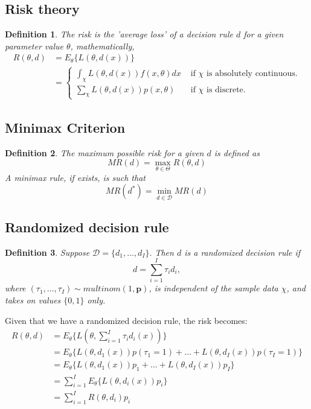 \documentclass[12pt]{report} \addtolength{\textheight}{2in}
\newtheorem{defn}{Definition}
\newcommand{\dec}{\mathscr{D}}
\begin{document}
\subsection*{Risk theory}
\begin{defn} The risk is the 'average loss' of a decision rule $d$ for a given parameter value $\theta$, mathematically,
\begin{align*}
R(\theta, d) &= E_{\theta} \{L(\theta, d(x))\}\\
&= \begin{cases}
\int_{\chi} L(\theta, d(x))f(x,\theta)dx & \text{ if $\chi$ is absolutely continuous.}\\
\sum_{\chi} L(\theta, d(x)) p(x,\theta)  & \text{ if $\chi$ is discrete.}
\end{cases}
\end{align*}
\end{defn}
\subsection*{Minimax Criterion}
\begin{defn}
The maximum possible risk for a given $d$ is defined as 
\begin{displaymath}
MR(d)=\max_{\theta \in \Theta} R(\theta, d)
\end{displaymath}
A minimax rule, if exists, is such that 
\begin{displaymath}
MR(d^*)=\min_{d\in\dec}MR(d)
\end{displaymath}
\end{defn}
\subsection*{Randomized decision rule}
\begin{defn}
Suppose $\dec= \{d_1,\dots, d_I\}.$ Then $d$ is a randomized decision rule if
\begin{displaymath}
d=\sum_{i=1}^{I} \tau_i d_i,
\end{displaymath}
where $(\tau_1,\dots,\tau_I ) \sim multinom(1,\textbf{p})$, is independent of the sample data $\chi$, and takes on values $\{0,1\}$ only.
\end{defn}
Given that we have a randomized decision rule, the risk becomes:
\begin{align*}
R(\theta, d)&= E_{\theta} \{L(\theta, \sum_{i=1}^{I} \tau_i d_i(x))\}\\
&= E_{\theta} \{L(\theta, d_1(x)) p(\tau_1=1) +\dots + L(\theta, d_I(x))p(\tau_I=1)\}\\
&=E_{\theta}\{L(\theta,d_1(x))p_1+\dots+L(\theta,d_I(x))p_I\}\\
&=\sum_{i=1}^{I} E_{\theta}\{L(\theta, d_i(x))p_i\}\\
&=\sum_{i=1}^{I} R(\theta, d_i) p_i
\end{align*}
\end{document}
